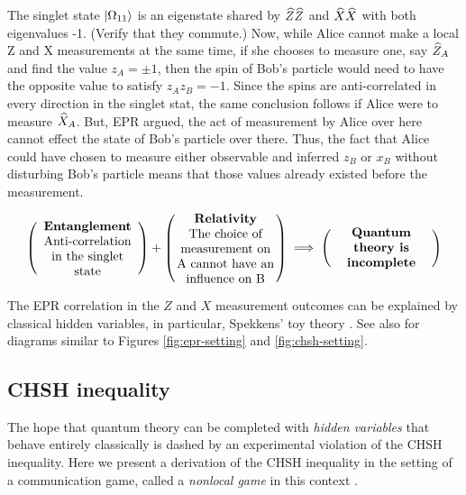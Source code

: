The singlet state $\ket{\Omega_{11}}$ is an eigenstate shared by $\widehat{Z}\widehat{Z}$ and $\widehat{X}\widehat{X}$ with both eigenvalues -1. (Verify that they commute.) Now, while Alice cannot make a local Z and X measurements at the same time, if she chooses to measure one, say $\widehat{Z}_A$ and find the value $z_A = \pm 1$, then the spin of Bob's particle would need to have the opposite value to satisfy $z_A z_B =-1$. Since the spins are anti-correlated in every direction in the singlet stat, the same conclusion follows if Alice were to measure $\widehat{X}_A$. But, EPR argued, the act of measurement by Alice over here cannot effect the state of Bob's particle over there. Thus, the fact that Alice could have chosen to measure either observable and inferred $z_B$ or $x_B$ without disturbing Bob's particle means that those values already existed before the measurement.

\begin{align*}
	\left(\parbox{8em}{\centering {\bf Entanglement} \\ Anti-correlation \\ in the singlet state}\right)
	+ \left(\parbox{8em}{\centering {\bf Relativity} \\ The choice of measurement on A cannot have an influence on B}\right)
	\implies 
	\left(\parbox{8em}{\centering {\bf Quantum theory is incomplete}}\right)
\end{align*}

\noindent The EPR correlation in the $Z$ and $X$ measurement outcomes can be explained by classical hidden variables, in particular, Spekkens' toy theory \cite{spekkens2007}. See also \cite{wood2015} for diagrams similar to Figures \ref{fig:epr-setting} and \ref{fig:chsh-setting}.

\subsection{CHSH inequality}\label{sec:chsh}

The hope that quantum theory can be completed with \emph{hidden variables} that behave entirely classically is dashed by an experimental violation of the CHSH inequality. Here we present a derivation of the CHSH inequality in the setting of a communication game, called a \emph{nonlocal game} in this context \cite{bell-nonlocality-review}.

